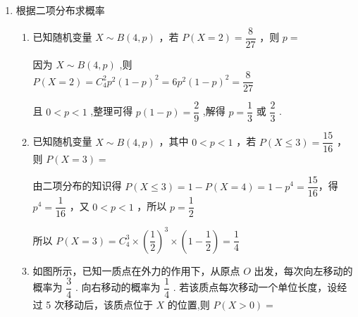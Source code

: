 \begin{enumerate}
\begin{enumerate}
\begin{jieda}
\begin{enumerate}
                则 $E\left( Y\right)  = {10} \times  {0.3} + {20} \times  {0.4} + {30} \times  {0.3} = {20}$ ,
                
                $D\left( Y\right)  = {\left( {10} - {20}\right) }^{2} \times  {0.3} + {\left( {20} - {20}\right) }^{2} \times  {0.4} + {\left( {30} - {20}\right) }^{2} \times  {0.3} = {60}.$
                
                由 $E\left( X\right)  > E\left( Y\right)$ 可知采用平台广告投放期望收益较大,又 $D\left( X\right)  > D\left( Y\right)$ ,说明平台广告投放的风险较高.
                
                综上所述, 如果公司期望高收益, 选择平台广告; 如果公司期望收益稳定, 选择传统广告.
            \end{enumerate}
        \end{jieda}
    \end{enumerate}
    \item 根据二项分布求概率
    \begin{enumerate}
        \item 已知随机变量 $X \sim  B\left( {4,p}\right)$ ，若 $P\left( {X = 2}\right)  = \dfrac{8}{27}$ ，则 $p =$
        \begin{jieda}
            因为 $X \sim  B\left( {4,p}\right)$ ,则 $P\left( {X = 2}\right)  = {{C}}_{4}^{2}{p}^{2}{\left( 1 - p\right) }^{2} = 6{p}^{2}{\left( 1 - p\right) }^{2} = \dfrac{8}{27}$
            
            且 $0 < p < 1$ ,整理可得 $p\left( {1 - p}\right)  = \dfrac{2}{9}$ ,解得 $p = \dfrac{1}{3}$ 或 $\dfrac{2}{3}$ .
        \end{jieda}
        \item 已知随机变量 $X \sim  B\left( {4,p}\right)$ ，其中 $0 < p < 1$ ，若 $P\left( {X \leq  3}\right)  = \dfrac{15}{16}$ ， 则 $P\left( {X = 3}\right)  =$
        \begin{jieda}
            由二项分布的知识得 $P\left( {X \leq  3}\right)  = 1 - P\left( {X = 4}\right)  = 1 - {p}^{4} = \dfrac{15}{16}$，得 ${p}^{4} = \dfrac{1}{16}$ ，又 $0 < p < 1$ ，所以 $p = \dfrac{1}{2}$
            
            所以 $P\left( {X = 3}\right)  = {{C}}_{4}^{3} \times  {\left( \dfrac{1}{2}\right) }^{3} \times  \left( {1 - \dfrac{1}{2}}\right)  = \dfrac{1}{4}$
        \end{jieda}
        
        \item 如图所示，已知一质点在外力的作用下，从原点 $O$ 出发，每次向左移动的概率为 $\dfrac{3}{4}$ . 向右移动的概率为 $\dfrac{1}{4}$ . 若该质点每次移动一个单位长度，设经过 5 次移动后，该质点位于 $X$ 的位置,则 $P\left( {X > 0}\right)  =$
        

\end{enumerate}
\end{enumerate}
